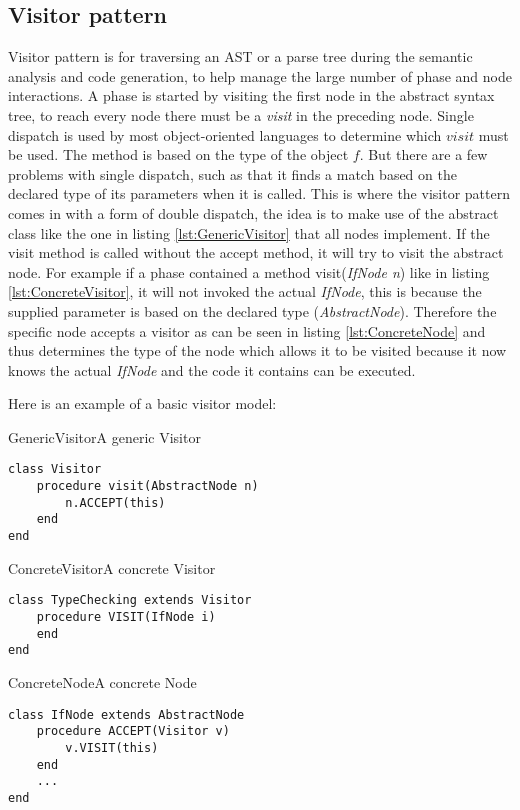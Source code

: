 \subsection{Visitor pattern}
\label{sec:VisitorPattern}
Visitor pattern is for traversing an AST or a parse tree during the semantic analysis and code generation, to help manage the large number of phase and node interactions. A phase is started by visiting the first node in the abstract syntax tree, to reach every node there must be a \textit{visit} in the preceding node.
Single dispatch is used by most object-oriented languages to determine which $visit$ must be used. The method is based on the type of the object $f$. But there are a few problems with single dispatch, such as that it finds a match based on the declared type of its parameters when it is called. This is where the visitor pattern comes in with a form of double dispatch, the idea is to make use of the abstract class like the one in listing \ref{lst:GenericVisitor} that all nodes implement. If the visit method is called without the accept method, it will try to visit the abstract node. For example if a phase contained a method visit(\textit{IfNode n}) like in listing \ref{lst:ConcreteVisitor}, it will not invoked the actual \textit{IfNode}, this is because the supplied parameter is based on the declared type (\textit{AbstractNode}). Therefore the specific node accepts a visitor as can be seen in listing \ref{lst:ConcreteNode} and thus determines the type of the node which allows it to be visited because it now knows the actual \textit{IfNode} and the code it contains can be executed.

Here is an example of a basic visitor model:

\begin{code}{GenericVisitor}{A generic Visitor}
\begin{lstlisting}
class Visitor
	procedure visit(AbstractNode n)
		n.ACCEPT(this)
	end
end
\end{lstlisting}
\end{code}

\begin{code}{ConcreteVisitor}{A concrete Visitor}
\begin{lstlisting}
class TypeChecking extends Visitor
	procedure VISIT(IfNode i)
	end
end
\end{lstlisting}
\end{code}

\begin{code}{ConcreteNode}{A concrete Node}
\begin{lstlisting}
class IfNode extends AbstractNode
	procedure ACCEPT(Visitor v)
		v.VISIT(this)
	end
	...
end
\end{lstlisting}
\end{code}